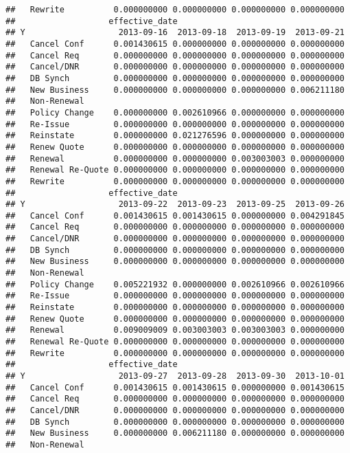 \documentclass[]{article}
\begin{document}
\begin{verbatim}
##   Rewrite          0.000000000 0.000000000 0.000000000 0.000000000
##                   effective_date
## Y                   2013-09-16  2013-09-18  2013-09-19  2013-09-21
##   Cancel Conf      0.001430615 0.000000000 0.000000000 0.000000000
##   Cancel Req       0.000000000 0.000000000 0.000000000 0.000000000
##   Cancel/DNR       0.000000000 0.000000000 0.000000000 0.000000000
##   DB Synch         0.000000000 0.000000000 0.000000000 0.000000000
##   New Business     0.000000000 0.000000000 0.000000000 0.006211180
##   Non-Renewal                                                     
##   Policy Change    0.000000000 0.002610966 0.000000000 0.000000000
##   Re-Issue         0.000000000 0.000000000 0.000000000 0.000000000
##   Reinstate        0.000000000 0.021276596 0.000000000 0.000000000
##   Renew Quote      0.000000000 0.000000000 0.000000000 0.000000000
##   Renewal          0.000000000 0.000000000 0.003003003 0.000000000
##   Renewal Re-Quote 0.000000000 0.000000000 0.000000000 0.000000000
##   Rewrite          0.000000000 0.000000000 0.000000000 0.000000000
##                   effective_date
## Y                   2013-09-22  2013-09-23  2013-09-25  2013-09-26
##   Cancel Conf      0.001430615 0.001430615 0.000000000 0.004291845
##   Cancel Req       0.000000000 0.000000000 0.000000000 0.000000000
##   Cancel/DNR       0.000000000 0.000000000 0.000000000 0.000000000
##   DB Synch         0.000000000 0.000000000 0.000000000 0.000000000
##   New Business     0.000000000 0.000000000 0.000000000 0.000000000
##   Non-Renewal                                                     
##   Policy Change    0.005221932 0.000000000 0.002610966 0.002610966
##   Re-Issue         0.000000000 0.000000000 0.000000000 0.000000000
##   Reinstate        0.000000000 0.000000000 0.000000000 0.000000000
##   Renew Quote      0.000000000 0.000000000 0.000000000 0.000000000
##   Renewal          0.009009009 0.003003003 0.003003003 0.000000000
##   Renewal Re-Quote 0.000000000 0.000000000 0.000000000 0.000000000
##   Rewrite          0.000000000 0.000000000 0.000000000 0.000000000
##                   effective_date
## Y                   2013-09-27  2013-09-28  2013-09-30  2013-10-01
##   Cancel Conf      0.001430615 0.001430615 0.000000000 0.001430615
##   Cancel Req       0.000000000 0.000000000 0.000000000 0.000000000
##   Cancel/DNR       0.000000000 0.000000000 0.000000000 0.000000000
##   DB Synch         0.000000000 0.000000000 0.000000000 0.000000000
##   New Business     0.000000000 0.006211180 0.000000000 0.000000000
##   Non-Renewal                                                     

\end{verbatim}
\end{document}
